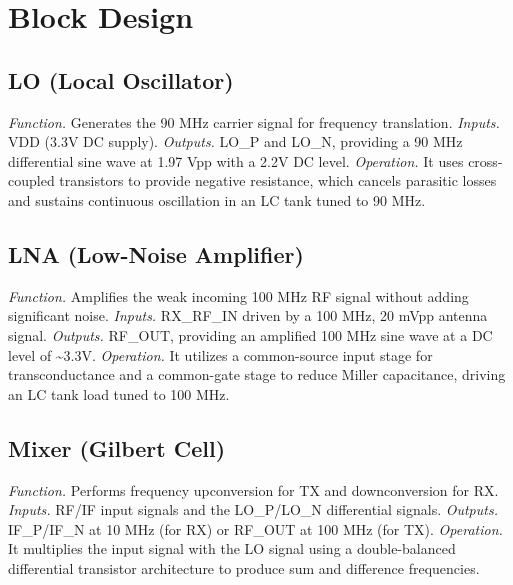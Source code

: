 \documentclass{ieeeaccess}
\begin{document}
\section{Block Design}
\subsection{LO (Local Oscillator)}
\textit{Function.} Generates the 90 MHz carrier signal for frequency translation.
\textit{Inputs.} VDD (3.3V DC supply).
\textit{Outputs.} LO\_P and LO\_N, providing a 90 MHz differential sine wave at 1.97 Vpp with a 2.2V DC level.
\textit{Operation.} It uses cross-coupled transistors to provide negative resistance, which cancels parasitic losses and sustains continuous oscillation in an LC tank tuned to 90 MHz.
\subsection{LNA (Low-Noise Amplifier)}
\textit{Function.} Amplifies the weak incoming 100 MHz RF signal without adding significant noise.
\textit{Inputs.} RX\_RF\_IN driven by a 100 MHz, 20 mVpp antenna signal.
\textit{Outputs.} RF\_OUT, providing an amplified 100 MHz sine wave at a DC level of \textasciitilde{}3.3V.
\textit{Operation.} It utilizes a common-source input stage for transconductance and a common-gate stage to reduce Miller capacitance, driving an LC tank load tuned to 100 MHz.
\subsection{Mixer (Gilbert Cell)}
\textit{Function.} Performs frequency upconversion for TX and downconversion for RX.
\textit{Inputs.} RF/IF input signals and the LO\_P/LO\_N differential signals.
\textit{Outputs.} IF\_P/IF\_N at 10 MHz (for RX) or RF\_OUT at 100 MHz (for TX).
\textit{Operation.} It multiplies the input signal with the LO signal using a double-balanced differential transistor architecture to produce sum and difference frequencies.
\end{document}
